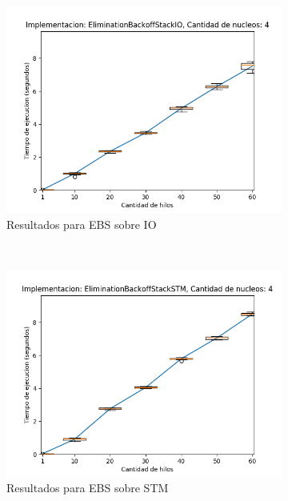 \begin{appendices}
\begin{figure}[t]
    \centering
    \begin{subfigure}[b]{0.49\textwidth}
        \includegraphics[width=\textwidth]{images/numberOfThreads/plots/expEBSIO-4}
        \caption{Resultados para EBS sobre IO}
        \label{subfig:numberOfThreads-ebsio-4}
    \end{subfigure}
    ~
    \begin{subfigure}[b]{0.49\textwidth}
        \includegraphics[width=\textwidth]{images/numberOfThreads/plots/expEBSSTM-4}
        \caption{Resultados para EBS sobre STM}
        \label{subfig:numberOfThreads-ebsstm-4}
    \end{subfigure}
    \begin{subfigure}[b]{0.49\textwidth}

\end{subfigure}
\end{figure}
\end{appendices}
